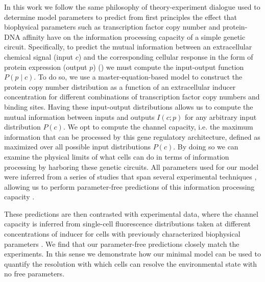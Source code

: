 In this work we follow the same philosophy of theory-experiment dialogue used to
determine model parameters to predict from first principles the effect that
biophysical parameters such as transcription factor copy number and protein-DNA
affinity have on the information processing capacity of a simple genetic
circuit. Specifically, to predict the mutual information between an
extracellular chemical signal (input $c$) and the corresponding cellular
response in the form of protein expression (output $p$) ()
we must compute the input-output function $P(p \mid c)$. To do so, we use a
master-equation-based model to construct the protein copy number distribution as
a function of an extracellular inducer concentration for different combinations
of transcription factor copy numbers and binding sites. Having these
input-output distributions allows us to compute the mutual information between
inputs and outputs $I(c; p)$ for any arbitrary input distribution $P(c)$. We opt
to compute the channel capacity, i.e. the maximum information that can be
processed by this gene regulatory architecture, defined as 
maximized over all possible input distributions $P(c)$. By doing so we can
examine the physical limits of what cells can do in terms of information
processing by harboring these genetic circuits. All parameters used for our
model were inferred from a series of studies that span several experimental
techniques \cite{Garcia2011c, Jones2014a, Brewster2014, Razo-Mejia2018},
allowing us to perform parameter-free predictions of this information processing
capacity \cite{Phillips2019}.

These predictions are then contrasted with experimental data, where the channel
capacity is inferred from single-cell fluorescence distributions taken at
different concentrations of inducer for cells with previously characterized
biophysical parameters \cite{Garcia2011c, Razo-Mejia2018}. We find that our
parameter-free predictions closely match the experiments. In this sense we
demonstrate how our minimal model can be used to quantify the resolution with
which cells can resolve the environmental state with no free parameters.

